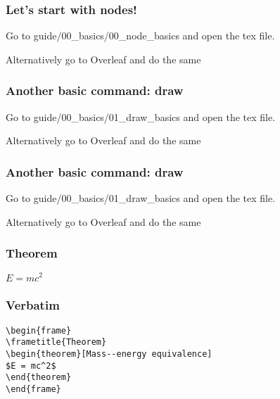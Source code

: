 \documentclass{beamer}
\begin{document}
\begin{frame}
    \frametitle{Let's start with nodes!}

    Go to guide/00\_basics/00\_node\_basics and open the tex file.

    Alternatively go to Overleaf and do the same

\end{frame}


\begin{frame}
    \frametitle{Another basic command: draw}

    Go to guide/00\_basics/01\_draw\_basics and open the tex file.

    Alternatively go to Overleaf and do the same

\end{frame}


\begin{frame}
    \frametitle{Another basic command: draw}

    Go to guide/00\_basics/01\_draw\_basics and open the tex file.

    Alternatively go to Overleaf and do the same

\end{frame}


\begin{frame}
\frametitle{Theorem}
\begin{theorem}
$E = mc^2$
\end{theorem}
\end{frame}


\begin{frame}[fragile] %
\frametitle{Verbatim}
\begin{example}
\begin{verbatim}
\begin{frame}
\frametitle{Theorem}
\begin{theorem}[Mass--energy equivalence]
$E = mc^2$
\end{theorem}
\end{frame}\end{verbatim}
\end{example}
\end{frame}
\end{document}
